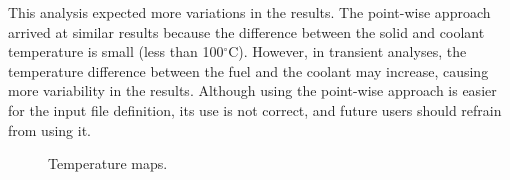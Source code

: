 This analysis expected more variations in the results.
The point-wise approach arrived at similar results because the difference between the solid and coolant temperature is small (less than 100$^{\circ}$C).
However, in transient analyses, the temperature difference between the fuel and the coolant may increase, causing more variability in the results.
Although using the point-wise approach is easier for the input file definition, its use is not correct, and future users should refrain from using it.

\begin{figure}[htbp!]
  \centering
  \hfill
  \caption{Temperature maps.}
  \label{fig:coupled-ave-results-th2}
\end{figure}

